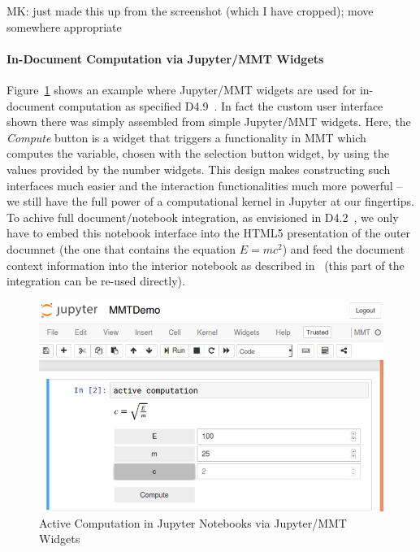 \begin{newpart}{MK: just made this up from the screenshot (which I have cropped); move somewhere appropriate}
  \paragraph{In-Document Computation via Jupyter/MMT Widgets}
  Figure~\ref{fig:ac} shows an example where Jupyter/MMT widgets are used for in-document computation as specified D4.9~\cite{ODK-D4.9}.
  In fact the custom user interface shown there was simply assembled from simple Jupyter/MMT widgets. Here, the \textit{Compute} button is a widget that triggers a functionality in MMT which computes the variable, chosen with the selection button widget, by using the values provided by the number widgets.
  This design makes constructing such interfaces much easier and the interaction functionalities much more powerful -- we still have the full power of a computational kernel in Jupyter at our fingertips. 
  To achive full document/notebook integration, as envisioned in D4.2~\cite{ODK-D4.2}, we only have to embed this notebook interface into the HTML5 presentation of the outer documnet (the one that contains the equation $E=mc^2$) and feed the document context information into the interior notebook as described in~\cite{ODK-D4.9} (this part of the integration can be re-used directly).

  \begin{figure}[ht]\centering
    \includegraphics[width=12cm]{activecomp}
    \caption{Active Computation in Jupyter Notebooks via Jupyter/MMT Widgets}\label{fig:ac}
  \end{figure}
\end{newpart}


